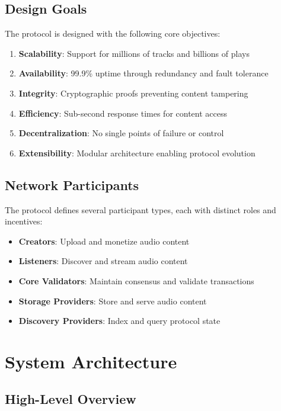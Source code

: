 \documentclass[11pt,a4paper]{article}
\begin{document}
\subsection{Design Goals}

The protocol is designed with the following core objectives:

\begin{enumerate}
  \item \textbf{Scalability}: Support for millions of tracks and billions of plays
  \item \textbf{Availability}: 99.9\% uptime through redundancy and fault tolerance
  \item \textbf{Integrity}: Cryptographic proofs preventing content tampering
  \item \textbf{Efficiency}: Sub-second response times for content access
  \item \textbf{Decentralization}: No single points of failure or control
  \item \textbf{Extensibility}: Modular architecture enabling protocol evolution
\end{enumerate}

\subsection{Network Participants}

The protocol defines several participant types, each with distinct roles and incentives:

\begin{itemize}
  \item \textbf{Creators}: Upload and monetize audio content
  \item \textbf{Listeners}: Discover and stream audio content
  \item \textbf{Core Validators}: Maintain consensus and validate transactions
  \item \textbf{Storage Providers}: Store and serve audio content
  \item \textbf{Discovery Providers}: Index and query protocol state
\end{itemize}

\section{System Architecture}

\subsection{High-Level Overview}
\end{document}

